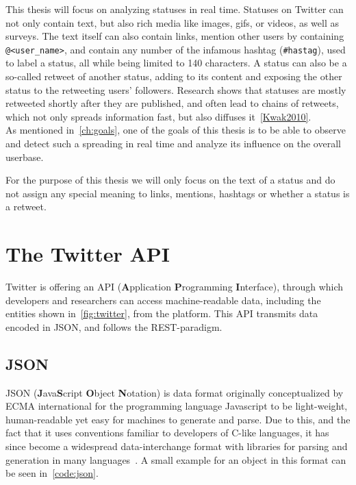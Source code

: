 \par
This thesis will focus on analyzing statuses in real time.
Statuses on Twitter can not only contain text, but also rich media like images, gifs, or videos, as well as surveys.
The text itself can also contain links, mention other users by containing \texttt{@<user_name>},
and contain any number of the infamous hashtag (\texttt{#hastag}), used to label a status, all while being limited to 140 characters.
A status can also be a so-called retweet of another status, adding to its content and exposing the other status to the retweeting users' followers.
Research shows that statuses are mostly retweeted shortly after they are published, and often lead to chains of retweets,
which not only spreads information fast, but also diffuses it~\ref{Kwak2010}.\\
As mentioned in~\ref{ch:goals}, one of the goals of this thesis is to be able to observe and detect such a spreading in real time
and analyze its influence on the overall userbase.
\par
For the purpose of this thesis we will only focus on the text of a status and do not assign any special meaning to links,
mentions, hashtags or whether a status is a retweet.\\


\section{The Twitter API}
\label{sec:theApi}

Twitter is offering an API (\textbf{A}pplication \textbf{P}rogramming \textbf{I}nterface),
through which developers and researchers can access machine-readable data,
including the entities shown in~\ref{fig:twitter}, from the platform.
This API transmits data encoded in JSON, and follows the REST-paradigm.

\subsection{JSON}
\label{subsec:json}

JSON (\textbf{J}ava\textbf{S}cript \textbf{O}bject \textbf{N}otation) is data format originally conceptualized by ECMA international
for the programming language Javascript to be light-weight, human-readable yet easy for machines to generate and parse.
Due to this, and the fact that it uses conventions familiar to developers of C-like languages,
it has since become a widespread data-interchange format with libraries for parsing and generation in many languages~\cite{jsonDocs}.
A small example for an object in this format can be seen in~\ref{code:json}.


